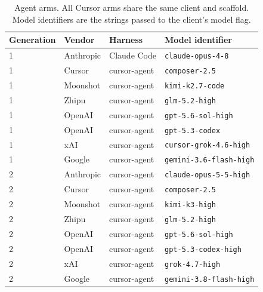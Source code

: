 \begin{table}[t]
\centering
\small
\caption{Agent arms. All Cursor arms share the same client and scaffold.
Model identifiers are the strings passed to the client's model flag.}
\label{tab:armlist}
\begin{tabular}{@{}llll@{}}
\toprule
Generation & Vendor & Harness & Model identifier \\
\midrule
1 & Anthropic & Claude Code & \texttt{claude-opus-4-8} \\
1 & Cursor    & cursor-agent & \texttt{composer-2.5} \\
1 & Moonshot  & cursor-agent & \texttt{kimi-k2.7-code} \\
1 & Zhipu     & cursor-agent & \texttt{glm-5.2-high} \\
1 & OpenAI    & cursor-agent & \texttt{gpt-5.6-sol-high} \\
1 & OpenAI    & cursor-agent & \texttt{gpt-5.3-codex} \\
1 & xAI       & cursor-agent & \texttt{cursor-grok-4.6-high} \\
1 & Google    & cursor-agent & \texttt{gemini-3.6-flash-high} \\
\midrule
2 & Anthropic & cursor-agent & \texttt{claude-opus-5-5-high} \\
2 & Cursor    & cursor-agent & \texttt{composer-2.5} \\
2 & Moonshot  & cursor-agent & \texttt{kimi-k3-high} \\
2 & Zhipu     & cursor-agent & \texttt{glm-5.2-high} \\
2 & OpenAI    & cursor-agent & \texttt{gpt-5.6-sol-high} \\
2 & OpenAI    & cursor-agent & \texttt{gpt-5.3-codex-high} \\
2 & xAI       & cursor-agent & \texttt{grok-4.7-high} \\
2 & Google    & cursor-agent & \texttt{gemini-3.8-flash-high} \\
\bottomrule
\end{tabular}
\end{table}

